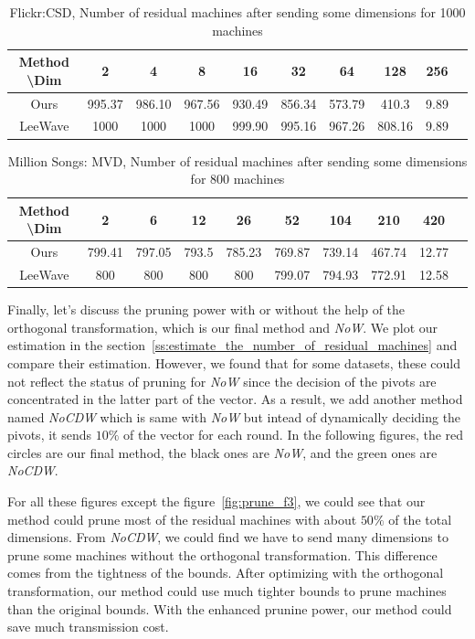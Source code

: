 \begin{table}[H]\begin{center}
\caption{Flickr:CSD, Number of residual machines after sending some dimensions for 1000 machines}\label{table:f2}
\begin{tabular}{|c|c|c|c|c|c|c|c|c|c|}
\hline 
Method \textbackslash Dim & 2 & 4 & 8 & 16 & 32 & 64 & 128 & 256\\ \hline \hline
Ours & 995.37 & 986.10 & 967.56 & 930.49 & 856.34 & 573.79 & 410.3 & 9.89 \\ \hline
LeeWave & 1000 & 1000 & 1000 & 999.90 & 995.16 & 967.26 & 808.16 & 9.89 \\ \hline
\end{tabular}
\end{center}\end{table}


\begin{table}[H]\begin{center}
\caption{Million Songs: MVD, Number of residual machines after sending some dimensions for 800 machines}\label{table:mvd}
\begin{tabular}{|c|c|c|c|c|c|c|c|c|c|}
\hline 
Method \textbackslash Dim & 2 & 6 & 12 & 26 & 52 & 104 & 210 & 420\\ \hline \hline
Ours & 799.41 & 797.05 & 793.5 & 785.23 & 769.87 & 739.14 & 467.74 & 12.77 \\ \hline
LeeWave & 800 & 800 & 800 & 800 & 799.07 & 794.93 & 772.91 & 12.58 \\ \hline
\end{tabular}
\end{center}\end{table}


Finally, let's discuss the pruning power with or without the help of the orthogonal transformation, which is our final method and \emph{NoW}.  We plot our estimation in the section~\ref{ss:estimate_the_number_of_residual_machines} and compare their estimation.  However, we found that for some datasets, these could not reflect the status of pruning for \emph{NoW} since the decision of the pivots are concentrated in the latter part of the vector.  As a result, we add another method named \emph{NoCDW} which is same with \emph{NoW} but intead of dynamically deciding the pivots, it sends $10\%$ of the vector for each round.  In the following figures, the red circles are our final method, the black ones are \emph{NoW}, and the green ones are \emph{NoCDW}.

For all these figures except the figure~\ref{fig:prune_f3}, we could see that our method could prune most of the residual machines with about $50\%$ of the total dimensions.  From \emph{NoCDW}, we could find we have to send many dimensions to prune some machines without the orthogonal transformation.  This difference comes from the tightness of the bounds.  After optimizing with the orthogonal transformation, our method could use much tighter bounds to prune machines than the original bounds.  With the enhanced prunine power, our method could save much transmission cost.

